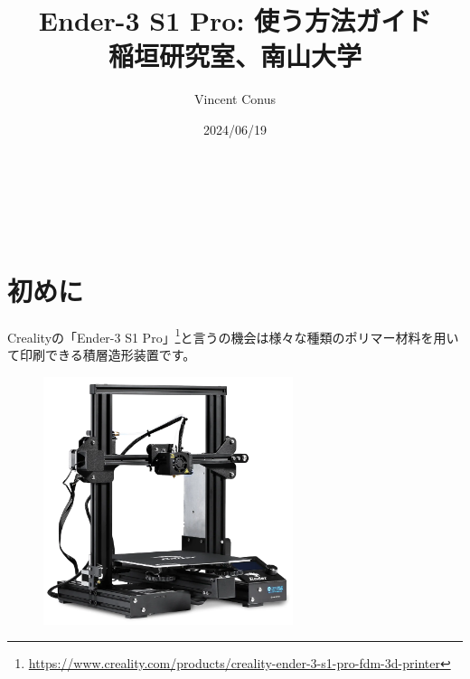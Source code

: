 \documentclass[10pt,a4paper,onecolumn,notitlepage,oneside,dvipdfmx]{article}
\author{Vincent Conus}
\date{2024/06/19}
\title{Ender-3 S1 Pro: 使う方法ガイド\\\medskip
\large 稲垣研究室、南山大学}
\makeatletter
\renewcommand{\maketitle}{%
\begin{center}{\Large \@title}\end{center}%
\begin{flushright}\@author\\ \@date\end{flushright}%
\hrulefill\\}
\makeatother
\begin{document}
\maketitle
\tableofcontents

\section{初めに}
\label{sec:orgbd3cd64}
Crealityの「Ender-3 S1 Pro」\footnote{\url{https://www.creality.com/products/creality-ender-3-s1-pro-fdm-3d-printer}}と言うの機会は様々な種類のポリマー材料を用いて印刷できる積層造形装置です。

\begin{figure}[htbp]
\centering
\includegraphics[width=0.65\textwidth]{img/ender3.png}
\end{figure}
\end{document}
